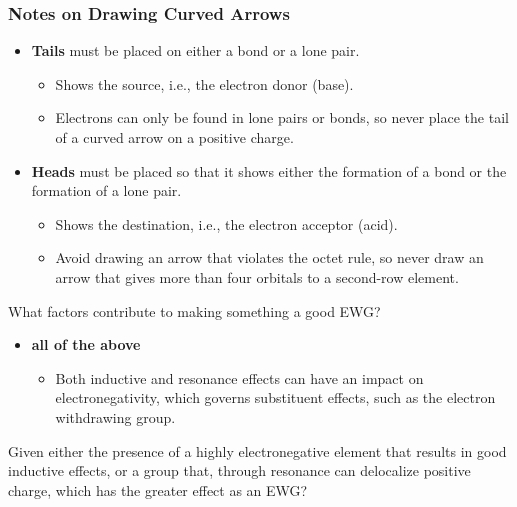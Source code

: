 \documentclass[12pt,a4paper]{article}
\begin{document}
\begin{enumerate}
\begin{itemize}
            \subsubsection{Notes on Drawing Curved Arrows}
            \begin{itemize}
                \item \textbf{Tails} must be placed on either a bond or a lone pair.
                    \begin{itemize}
                        \item Shows the {\color{o-Sun}source}, i.e., the electron donor (base).
                        \item Electrons can only be found in lone pairs or bonds, so {\color{o-Sun}never place the tail} of a curved arrow on a {\color{pos}positive charge}.
                    \end{itemize}
                \item \textbf{Heads} must be placed so that it shows either the formation of a bond or the formation of a lone pair.
                    \begin{itemize}
                        \item Shows the {\color{o-Sun}destination}, i.e., the electron acceptor (acid).
                        \item Avoid drawing an arrow that violates the octet rule, so never draw an arrow that gives more than four orbitals to a second-row element.
                    \end{itemize}
                \end{itemize}
        \end{itemize}
    {\color{G-Moon}\item What factors contribute to making something a good EWG?}
        \begin{itemize}
            \item {\color{o-Sun}\textbf{all of the above}}
                \begin{itemize}
                    \item Both inductive and resonance effects can have an impact on electronegativity, which governs substituent effects, such as the electron withdrawing group.
                \end{itemize}
        \end{itemize}
    {\color{G-Moon}\item Given either the presence of a highly electronegative element that results in good inductive effects, or a group that, through resonance can delocalize positive charge, which has the greater effect as an EWG?}

\end{enumerate}
\end{document}
